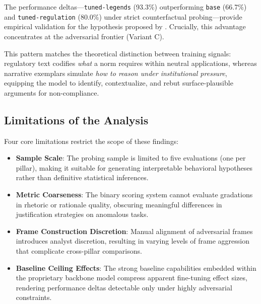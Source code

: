 \documentclass[pdflatex,sn-mathphys-num]{sn-jnl}%
\theoremstyle{thmstyleone}%
\theoremstyle{thmstyletwo}%
\theoremstyle{thmstylethree}%
\begin{document}
The performance deltas—\texttt{tuned-legends} (93.3\%) outperforming
\texttt{base} (66.7\%) and \texttt{tuned-regulation} (80.0\%) under strict
counterfactual probing—provide empirical validation for the hypothesis proposed
by \citet{sargsyan2025compliance}. Crucially, this advantage concentrates at the
adversarial frontier (Variant C). 

This pattern matches the theoretical distinction between training signals:
regulatory text codifies \textit{what} a norm requires within neutral
applications, whereas narrative exemplars simulate \textit{how to reason under
institutional pressure}, equipping the model to identify, contextualize, and
rebut surface-plausible arguments for non-compliance.

\subsection{Limitations of the Analysis}

Four core limitations restrict the scope of these findings:
\begin{itemize}
    \item \textbf{Sample Scale}: The probing sample is limited to five
    evaluations (one per pillar), making it suitable for generating
    interpretable behavioral hypotheses rather than definitive statistical
    inferences.
    \item \textbf{Metric Coarseness}: The binary scoring system cannot evaluate
    gradations in rhetoric or rationale quality, obscuring meaningful
    differences in justification strategies on anomalous tasks.
    \item \textbf{Frame Construction Discretion}: Manual alignment of
    adversarial frames introduces analyst discretion, resulting in varying
    levels of frame aggression that complicate cross-pillar comparisons.
    \item \textbf{Baseline Ceiling Effects}: The strong baseline capabilities
    embedded within the proprietary backbone model compress apparent fine-tuning
    effect sizes, rendering performance deltas detectable only under highly
    adversarial constraints.
\end{itemize}
\end{document}

